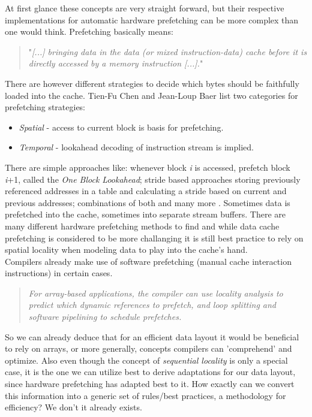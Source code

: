 At first glance these concepts are very straight forward, but their respective implementations for automatic hardware prefetching can be more complex than one would think. Prefetching basically means:
\begin{quote}
"\textit{[...] bringing data in the data (or mixed instruction-data) cache before it is directly accessed by a memory instruction [...].}" 
\end{quote}
There are however different strategies to decide which bytes should be faithfully loaded into the cache. Tien-Fu Chen and Jean-Loup Baer list two categories for prefetching strategies: 
\begin{itemize}
	\item \textit{Spatial} - access to current block is basis for prefetching.
	\item \textit{Temporal} - lookahead decoding of instruction stream is implied.
\end{itemize}
There are simple approaches like: whenever block \textit{i} is accessed, prefetch block \textit{i}+1, called the \textit{One Block Lookahead}; stride based approaches storing previously referenced addresses in a table and calculating a stride based on current and previous addresses; combinations of both and many more .  Sometimes data is prefetched into the cache, sometimes into separate stream buffers. There are many different hardware prefetching methods to find and while data cache prefetching is considered to be more challanging  it is still best practice to rely on spatial locality when modeling data to play into the cache's hand.\\
Compilers already make use of software prefetching (manual cache interaction instructions) in certain cases.
\begin{quote}
	\textit{For array-based applications, the compiler can use locality analysis to predict which dynamic references to prefetch, and loop splitting and software pipelining to schedule prefetches.} 
\end{quote}
So we can already deduce that for an efficient data layout it would be beneficial to rely on arrays, or more generally, concepts compilers can 'comprehend' and optimize. Also even though the concept of \textit{sequential locality} is only a special case, it is the one we can utilize best to derive adaptations for our data layout, since hardware prefetching has adapted best to it. How exactly can we convert this information into a generic set of rules/best practices, a methodology for efficiency? We don't it already exists.

